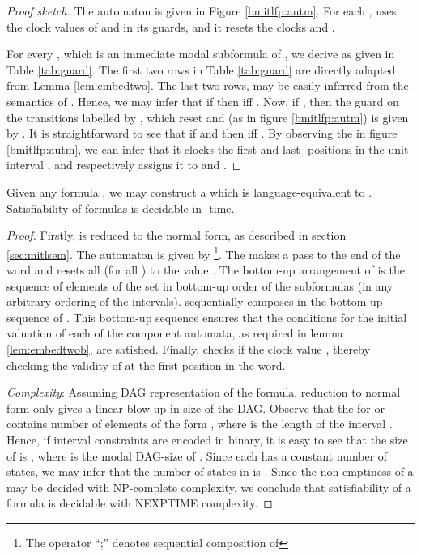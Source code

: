 \documentclass{llncs}
\newcommand{\POTDFA}{\mbox{}}
\newcommand{\bmitlfp}{\mbox{}}
\newcommand{\potdta}{\mbox{}}
\newcommand{\potdfa}{\POTDFA}
\newcommand{\mitlfpb}{\bmitlfp}
\newcommand{\nexp}{\mbox{}}
\begin{document}
\begin{proof}[Proof sketch]
The automaton  is given in Figure \ref{bmitlfp:autm}. For each ,  uses the  clock values of  and  in its guards, and it resets the clocks  and . 

For every , which is an immediate modal subformula of , we derive  as given in Table \ref{tab:guard}. The first two rows in Table \ref{tab:guard} are directly adapted from Lemma \ref{lem:embedtwo}. The last two rows, may be easily inferred from the semantics of \mitlfpb. Hence, we may infer that  if  then  iff . Now, if , then the guard on the transitions labelled by , which reset  and  (as in figure \ref{bmitlfp:autm}) is given by . It is straightforward to see that  if  and  then  iff . By observing the \potdta\/ in figure  \ref{bmitlfp:autm},  we can infer that it clocks the first and last -positions in the unit interval , and respectively assigns it to  and . 
\end{proof}

\begin{theorem}
Given any \mitlfpb\/ formula , we may construct a \potdta\/ which is language-equivalent to . Satisfiability of \mitlfpb\/ formulas is decidable in \nexp-time.
\end{theorem}
\begin{proof}
Firstly,  is reduced to the normal form, as described in section \ref{sec:mitlsem}. The automaton is given by  \footnote{The operator ``;'' denotes sequential composition of \potdta}.  The \potdta\/  makes a pass to the end of the word and resets all  (for all ) to the value . The bottom-up arrangement of  is the sequence of elements  of the set in bottom-up order of the subformulas  (in any arbitrary ordering of the intervals).  sequentially composes  in the bottom-up sequence of . This bottom-up sequence ensures that the conditions for the initial valuation of each of the component automata, as required in lemma \ref{lem:embedtwob}, are satisfied.
Finally,  checks if the clock value , thereby checking the validity of  at the first position in the word. 

\noindent
\emph{Complexity}: Assuming DAG representation of the formula, reduction to normal form only gives a linear blow up in size of the DAG. Observe that the   for  or   contains  number of elements of the form , where  is the length of the interval . Hence, if interval constraints are encoded in binary, it is easy to see that the size of  is , where  is the modal DAG-size of . 
Since each   has a constant number of states, we may infer that the number of states in  is . 
Since the non-emptiness of a \potdfa\/ may be decided with NP-complete complexity, we conclude that satisfiability of a \mitlfpb\/ formula is decidable with NEXPTIME complexity. 
\end{proof}
\end{document}
